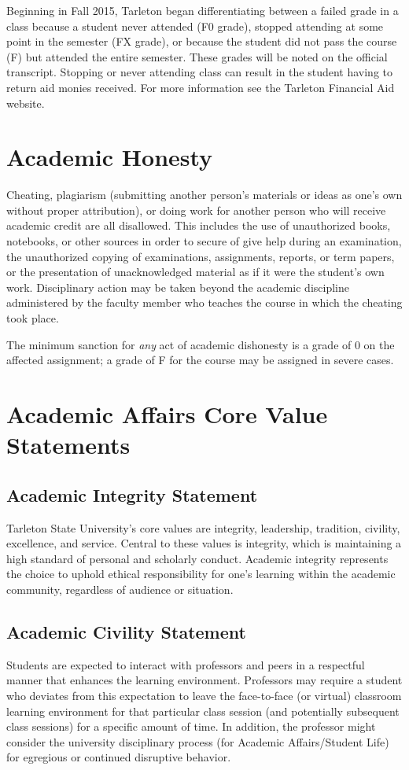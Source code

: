 \documentclass[10pt]{article}
\begin{document}
Beginning in Fall 2015, Tarleton began differentiating between a failed grade in a class because a student never attended (F0 grade), stopped attending at some point in the semester (FX grade), or because the student did not pass the course (F) but attended the entire semester. These grades will be noted on the official transcript. Stopping or never attending class can result in the student having to return aid monies received.  For more information see the Tarleton Financial Aid website.

\section*{Academic Honesty}
\label{sec:orgcb01f1d}

Cheating, plagiarism (submitting another person’s materials or ideas as one’s own without proper attribution), or doing work for another person who will receive academic credit are all disallowed. This includes the use of unauthorized books, notebooks, or other sources in order to secure of give help during an examination, the unauthorized copying of examinations, assignments, reports, or term papers, or the presentation of unacknowledged material as if it were the student’s own work. Disciplinary action may be taken beyond the academic discipline administered by the faculty member who teaches the course in which the cheating took place.

The minimum sanction for \emph{any} act of academic dishonesty is a grade of 0 on the affected assignment; a grade of F for the course may be assigned in severe cases.

\section*{Academic Affairs Core Value Statements}
\label{sec:orgb64f471}
\subsection*{Academic Integrity Statement}
\label{sec:org2e27a5d}
Tarleton State University's core values are integrity, leadership, tradition, civility, excellence, and service.  Central to these values is integrity, which is maintaining a high standard of personal and scholarly conduct.  Academic integrity represents the choice to uphold ethical responsibility for one’s learning within the academic community, regardless of audience or situation.

\subsection*{Academic Civility Statement}
\label{sec:orgd1bbd26}
Students are expected to interact with professors and peers in a respectful manner that enhances the learning environment. Professors may require a student who deviates from this expectation to leave the face-to-face (or virtual) classroom learning environment for that particular class session (and potentially subsequent class sessions) for a specific amount of time. In addition, the professor might consider the university disciplinary process (for Academic Affairs/Student Life) for egregious or continued disruptive behavior.
\end{document}
